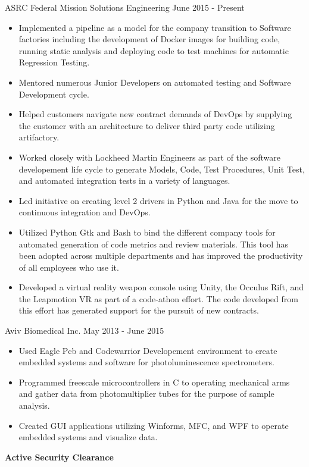 \documentclass[11pt]{article}
\begin{document}
\newcommand{\NewJobTitle}[2]
{
  \begin{flushleft}
	#1
	\hfill #2 \hfill
  \end{flushleft}
}

\newcommand{\JobBullet}[1]
{
    \begin{itemize}
	\item #1
    \end{itemize}
}

\smallskip

\ExecutiveSummary
\bigskip

\Education
\bigskip

\NewJobTitle{ASRC Federal Mission Solutions Engineering}{June 2015 - Present}
\JobBullet{Implemented a pipeline as a model for the company transition to Software factories including the development of Docker images for building code, running static analysis and deploying code to test machines for automatic Regression Testing.} 
\JobBullet{Mentored numerous Junior Developers on automated testing and Software Development cycle.}
\JobBullet{Helped customers navigate new contract demands of DevOps by supplying the customer with an architecture to deliver third party code utilizing artifactory.}
\JobBullet{Worked closely with Lockheed Martin Engineers as part of the software developement life cycle to generate Models, Code, Test Procedures, Unit Test, and automated integration tests in a variety of languages.}
\JobBullet{Led initiative on creating level 2 drivers in Python and Java for the move to continuous integration and DevOps.}
\JobBullet{Utilized Python Gtk and Bash to bind the different company tools for automated generation of code metrics and review materials.  This tool has been adopted across multiple departments and has improved the productivity of all employees who use it.}
\JobBullet{Developed a virtual reality weapon console using Unity, the Occulus Rift, and the Leapmotion VR as part of a code-athon effort. The code developed from this effort has generated support for the pursuit of new contracts.}


\NewJobTitle{Aviv Biomedical Inc.}{May 2013 - June 2015}
\JobBullet{Used Eagle Pcb and Codewarrior Developement environment to create embedded systems and software for photoluminescence spectrometers.}
\JobBullet{Programmed freescale microcontrollers in C to operating mechanical arms and gather data from photomultiplier tubes for the purpose of sample analysis.}
\JobBullet{Created GUI applications utilizing Winforms, MFC, and WPF to operate embedded systems and visualize data.}

\centerline{\textbf{Active Security Clearance}}
\end{document}
